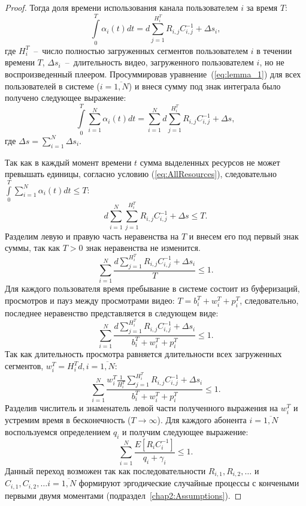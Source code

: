 \begin{proof}
Тогда доля времени использования канала пользователем $i$ за время $T$:
\begin{equation}
	\label{eq:lemma_1}
	\int\limits_{0}^{T}\alpha_i(t) dt = d\sum\limits_{j=1}^{H_i^T}R_{i,j}C_{i,j}^{-1} + \Delta s_i,
\end{equation}
где $H_i^T$~--~число полностью загруженных сегментов пользователем $i$ в течении времени $T$, $\Delta s_i$~--~длительность видео, загруженного пользователем $i$, но не воспроизведенный плеером. Просуммировав уравнение~(\ref{eq:lemma_1}) для всех пользователей в системе ($i=\overline{1,N}$) и внеся сумму под знак интеграла было получено следующее выражение:
\begin{equation}
	\nonumber
	\int\limits_{0}^{T}\sum\limits_{i=1}^{N}\alpha_i(t)dt = \sum\limits_{i=1}^{N}d\sum\limits_{j=1}^{H_i^T}R_{i,j}C_{i,j}^{-1} + \Delta s,
\end{equation}
где $\Delta s = \sum\limits_{i=1}^{N} \Delta s_i$.

Так как в каждый момент времени $t$ сумма выделенных ресурсов не может превышать единицы, согласно условию (\ref{eq:AllResources}), следовательно $\int\limits_{0}^{T}\sum\limits_{i=1}^{N}\alpha_i(t)dt \leq T$:
\begin{equation}
	\nonumber
	d\sum\limits_{i=1}^{N}\sum\limits_{j=1}^{H_i^T}R_{i,j}C_{i,j}^{-1} + \Delta s \leq T.
\end{equation}
Разделим левую и правую часть неравенства на $T$ и внесем его под первый знак суммы, так как $T>0$ знак неравенства не изменится.
\begin{equation}
	\nonumber
	\sum\limits_{i=1}^{N}{\frac{d\sum\limits_{j=1}^{H_i^T}R_{i,j}C_{i,j}^{-1} + \Delta s_i}{T}} \leq 1.
\end{equation}
Для каждого пользователя время пребывание в системе состоит из буферизаций, просмотров и пауз между просмотрами видео: $T = b_i^T + w_i^T + p_i^T $, следовательно, последнее неравенство представляется в следующем виде:
\begin{equation}
	\nonumber
	 \sum\limits_{i=1}^{N}{\frac{d\sum\limits_{j=1}^{H_i^T}R_{i,j}C_{i,j}^{-1} + \Delta s_i}{b_i^T + w_i^T + p_i^T}} \leq 1.
\end{equation}
Так как длительность просмотра равняется длительности всех загруженных сегментов, $w_i^T = H_i^T d,i=\overline{1,N}$:
\begin{equation}
	\nonumber
	\sum\limits_{i=1}^{N}\frac{w_i^T \frac{1}{H_i^T}\sum\limits_{j=1}^{H_i^T}R_{i,j}C_{i,j}^{-1} + \Delta s_i}{b_i^T + w_i^T + p_i^T} \leq 1.
\end{equation}
Разделив числитель и знаменатель левой части полученного выражения на $w_i^T$ и устремим время в бесконечность ($T\rightarrow\infty$). Для каждого абонента $i = \overline{1,N}$ воспользуемся определением $q_i$ и получим следующее выражение:
\begin{equation}
	\nonumber
	\sum\limits_{i=1}^{N}\frac{E\left[R_{i}C_{i}^{-1}\right] }{q_i + \gamma_i} \leq 1.
\end{equation}
Данный переход возможен так как последовательности $R_{i,1}, R_{i,2}, \ldots$ и $C_{i,1}, C_{i,2}, \ldots i=\overline{1,N}$ формируют эргодические случайные процессы с кончеными первыми двумя моментами (подраздел~\ref{chap2:Assumptions}).


\end{proof}
